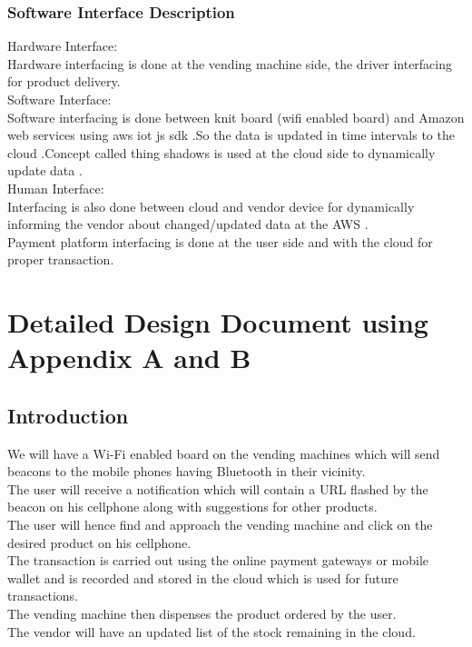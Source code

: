 \documentclass[oneside,a4paper,12pt]{report}
\begin{document}
\subsection{Software Interface Description}	 
Hardware Interface: \\
Hardware interfacing is done at the vending machine side, the driver interfacing for product delivery.\\
Software Interface:\\
Software interfacing is done between knit board (wifi enabled board) and Amazon web services  using aws iot js sdk .So the data is updated in time intervals to the cloud .Concept called thing shadows is used at the cloud side to dynamically update data .\\
Human Interface:\\
Interfacing is also done between cloud and vendor device for dynamically informing the vendor about changed/updated data at the AWS .\\
Payment platform interfacing is done at the user side and with the cloud for proper transaction.\\
\chapter{Detailed Design Document using Appendix A and B}
 \section{Introduction}  
We will have a Wi-Fi enabled board on the vending machines which will send beacons to the mobile phones having Bluetooth in their vicinity.\\
The user will receive a notification which will contain a URL flashed by the beacon on his cellphone along with suggestions for other products.\\
The user will hence find and approach the vending machine and click on the desired product on his cellphone.\\
The transaction is carried out using the online payment gateways or mobile wallet and is recorded and stored in the cloud which is used for future transactions.\\
The vending machine then dispenses the product ordered by the user.\\
The vendor will have an updated list of the stock remaining in the cloud.\\
\end{document}
